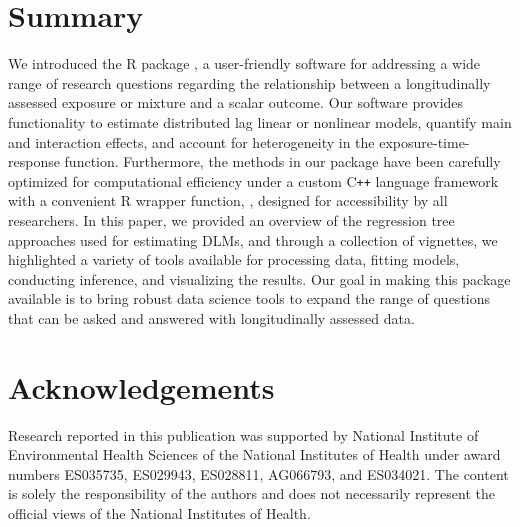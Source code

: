 \section{Summary}
We introduced the R package , a user-friendly software for addressing a wide range of research questions regarding the relationship between a longitudinally assessed exposure or mixture and a scalar outcome. Our software provides functionality to estimate distributed lag linear or nonlinear models, quantify main and interaction effects, and account for heterogeneity in the exposure-time-response function. Furthermore, the methods in our package have been carefully optimized for computational efficiency under a custom C\texttt{++} language framework with a convenient R wrapper function, , designed for accessibility by all researchers. In this paper, we provided an overview of the regression tree approaches used for estimating DLMs, and through a collection of vignettes, we highlighted a variety of tools available for processing data, fitting models, conducting inference, and visualizing the results. Our goal in making this package available is to bring robust data science tools to expand the range of questions that can be asked and answered with longitudinally assessed data.

\section{Acknowledgements}

Research reported in this publication was supported by National Institute of Environmental Health Sciences of the National Institutes of Health under award numbers ES035735, ES029943, ES028811, AG066793, and ES034021. The content is solely the responsibility of the authors and does not necessarily represent the official views of the National Institutes of Health.



\address{Seongwon Im\\
  Department of Statistics\\
  Colorado State University\\
  United States of America\\
  (0009-0000-8447-5852)\\
  }

\address{Ander Wilson\\
  Department of Statistics\\
  Colorado State University\\
  United States of America\\
  (0000-0003-4774-3883)\\
  }

\address{Daniel Mork\\
  Department of Biostatistics\\
  Harvard T.H. Chan School of Public Health\\
  United States of America\\
  (0000-0002-7924-0706)\\
  }
